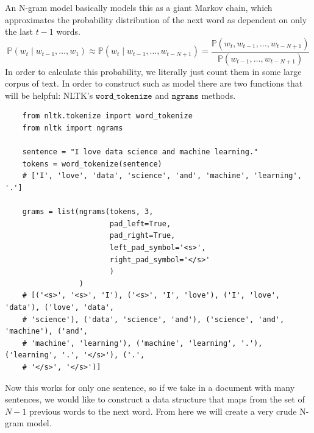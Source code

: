 \documentclass{article}
\begin{document}
    An N-gram model basically models this as a giant Markov chain, which approximates the probability distribution of the next word as dependent on only the last $t-1$ words.
    \[\mathbb{P}(w_t \mid w_{t-1}, \ldots, w_{1}) \approx \mathbb{P}( w_t \mid w_{t-1}, \ldots, w_{t - N + 1}) = \frac{\mathbb{P}(w_t, w_{t-1}, \ldots, w_{t-N+1})}{\mathbb{P}(w_{t-1}, \ldots, w_{t-N+1})}\]
    In order to calculate this probability, we literally just count them in some large corpus of text. 
    In order to construct such as model there are two functions that will be helpful: NLTK's $\texttt{word\_tokenize}$ and $\texttt{ngrams}$ methods. 
    \begin{lstlisting}
    from nltk.tokenize import word_tokenize 
    from nltk import ngrams 

    sentence = "I love data science and machine learning."
    tokens = word_tokenize(sentence) 
    # ['I', 'love', 'data', 'science', 'and', 'machine', 'learning', '.']

    grams = list(ngrams(tokens, 3, 
                        pad_left=True, 
                        pad_right=True, 
                        left_pad_symbol='<s>', 
                        right_pad_symbol='</s>'
                        ) 
                 )
    # [('<s>', '<s>', 'I'), ('<s>', 'I', 'love'), ('I', 'love', 'data'), ('love', 'data', 
    # 'science'), ('data', 'science', 'and'), ('science', 'and', 'machine'), ('and', 
    # 'machine', 'learning'), ('machine', 'learning', '.'), ('learning', '.', '</s>'), ('.', 
    # '</s>', '</s>')]
    \end{lstlisting}
    Now this works for only one sentence, so if we take in a document with many sentences, we would like to construct a data structure that maps from the set of $N-1$ previous words to the next word. From here we will create a very crude N-gram model. 
\end{document}
